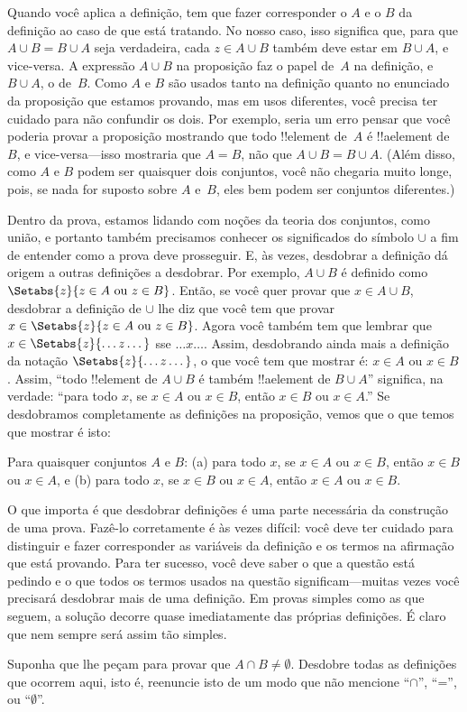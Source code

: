 \documentclass[../../../include/open-logic-section]{subfiles}
\begin{document}
Quando você aplica a definição, tem que fazer corresponder o $A$ e o $B$ da
definição ao caso de que está tratando.  No nosso caso, isso significa
que, para que $A \cup B = B \cup A$ seja verdadeira, cada $z \in A \cup
B$ também deve estar em $B \cup A$, e vice-versa.  A expressão $A \cup
B$ na proposição faz o papel de~$A$ na definição, e $B
\cup A$, o de~$B$. Como $A$ e $B$ são usados tanto na definição
quanto no enunciado da proposição que estamos provando, mas em
usos diferentes, você precisa ter cuidado para não confundir
os dois.  Por exemplo, seria um erro pensar que você poderia
provar a proposição mostrando que todo !!{element} de~$A$ é
!!a{element} de~$B$, e vice-versa---isso mostraria que $A = B$,
não que $A \cup B = B \cup A$. (Além disso, como $A$ e $B$ podem ser quaisquer
dois conjuntos, você não chegaria muito longe, pois, se nada for suposto sobre
$A$ e~$B$, eles bem podem ser conjuntos diferentes.)

Dentro da prova, estamos lidando com noções da teoria dos conjuntos, como
união, e portanto também precisamos conhecer os significados do símbolo $\cup$ a fim
de entender como a prova deve prosseguir. E, às vezes,
desdobrar a definição dá origem a outras definições a
desdobrar. Por exemplo, $A \cup B$ é definido como $\Setabs{z}{z \in A
  \text{ ou } z \in B}$. Então, se você quer provar que $x \in A \cup
B$, desdobrar a definição de $\cup$ lhe diz que você tem que
provar $x \in \Setabs{z}{z \in A \text{ ou } z \in B}$.  Agora você também
tem que lembrar que $x \in \Setabs{z}{\dots z\dots}$ sse $\dots
x\dots$.  Assim, desdobrando ainda mais a definição da
notação $\Setabs{z}{\dots z \dots}$, o que você tem que mostrar é: $x \in
A$ ou $x \in B$. Assim, ``todo !!{element} de $A \cup B$ é também
!!a{element} de $B \cup A$'' significa, na verdade: ``para todo $x$, se $x \in
A$ ou $x \in B$, então $x \in B$ ou $x \in A$.''  Se desdobramos
completamente as definições na proposição, vemos que o que temos que
mostrar é isto:

\begin{prop}
Para quaisquer conjuntos $A$ e $B$: (a) para todo $x$, se $x \in A$ ou $x \in
B$, então $x \in B$ ou $x \in A$, e (b) para todo $x$, se $x \in B$
ou $x \in A$, então $x \in A$ ou $x \in B$.
\end{prop}

O que importa é que desdobrar definições é uma parte necessária da
construção de uma prova. Fazê-lo corretamente é às vezes difícil: você
deve ter cuidado para distinguir e fazer corresponder as variáveis da
definição e os termos na afirmação que está provando.  Para ter
sucesso, você deve saber o que a questão está pedindo e o que todos os
termos usados na questão significam---muitas vezes você precisará desdobrar mais
de uma definição.  Em provas simples como as que seguem, a
solução decorre quase imediatamente das próprias
definições. É claro que nem sempre será assim tão simples.

\begin{prob}
Suponha que lhe peçam para provar que $A \cap B \neq \emptyset$. Desdobre
todas as definições que ocorrem aqui, isto é, reenuncie isto de um modo que
não mencione ``$\cap$'', ``='', ou ``$\emptyset$''.
\end{prob}
\end{document}
